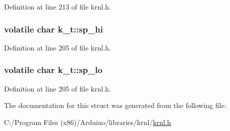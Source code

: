 Definition at line 213 of file krnl.\+h.

\hypertarget{structk__t_acb129ee9a4e02ae9c68d07c72c0db02d}{}
\subsubsection[{sp\+\_\+hi}]{\setlength{\rightskip}{0pt plus 5cm}volatile char k\+\_\+t\+::sp\+\_\+hi}\label{structk__t_acb129ee9a4e02ae9c68d07c72c0db02d}


Definition at line 205 of file krnl.\+h.

\hypertarget{structk__t_a1e6a2845b26a85e548e64a8ae310d7ac}{}
\subsubsection[{sp\+\_\+lo}]{\setlength{\rightskip}{0pt plus 5cm}volatile char k\+\_\+t\+::sp\+\_\+lo}\label{structk__t_a1e6a2845b26a85e548e64a8ae310d7ac}


Definition at line 205 of file krnl.\+h.



The documentation for this struct was generated from the following file\+:\begin{DoxyCompactItemize}
\item 
C\+:/\+Program Files (x86)/\+Arduino/libraries/krnl/\hyperlink{krnl_8h}{krnl.\+h}\end{DoxyCompactItemize}
